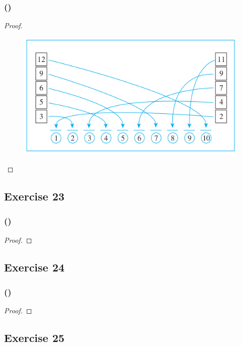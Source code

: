 \documentclass[14pt]{extarticle}
\begin{document}
\subsubsection{()}

\begin{proof}
\begin{figure}[ht!]
\centering
\includegraphics[scale=0.5]{../images/11.5.20.png}
\end{figure}
\end{proof}

\subsection{Exercise 23}

\subsubsection{()}

\begin{proof}

\end{proof}

\subsection{Exercise 24}

\subsubsection{()}

\begin{proof}

\end{proof}

\subsection{Exercise 25}
\end{document}
